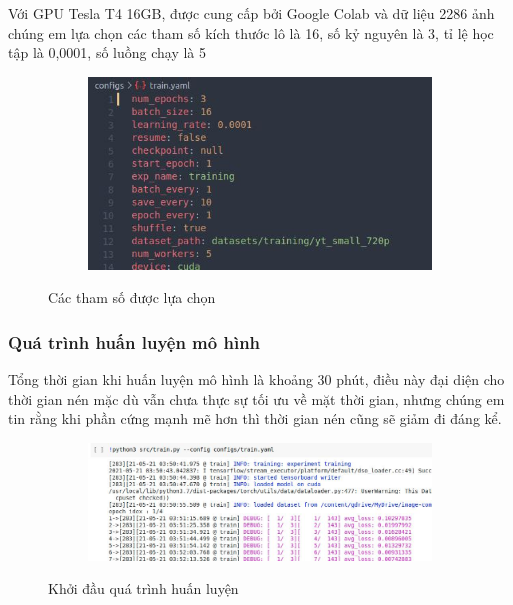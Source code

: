 Với GPU Tesla T4 16GB, được cung cấp bởi Google Colab và dữ liệu 
2286 ảnh chúng em lựa chọn các tham số kích thước lô là 16, số kỷ nguyên là 3,
tỉ lệ học tập là 0,0001, số luồng chạy là 5

\begin{figure}
    \begin{subfigure}{0.7\textwidth}
        \includegraphics[width=1.\linewidth]{Chapters/items/pram.jpg}
        \caption{}
        \label{fig: param}
    \end{subfigure}
    \caption{Các tham số được lựa chọn}
\end{figure}

\subsubsection{Quá trình huấn luyện mô hình}

Tổng thời gian khi huấn luyện mô hình là khoảng 30 phút, điều này 
đại diện cho thời gian nén mặc dù vẫn chưa thực sự tối ưu về mặt 
thời gian, nhưng chúng em tin rằng khi phần cứng mạnh mẽ hơn thì
thời gian nén cũng sẽ giảm đi đáng kể.

\begin{figure}
    \begin{subfigure}{0.8\textwidth}
        \includegraphics[width=1.\linewidth]{Chapters/items/colab1.jpg}
        \caption{}
        \label{fig: colab1}
    \end{subfigure}
    \caption{Khởi đầu quá trình huấn luyện}
\end{figure}

